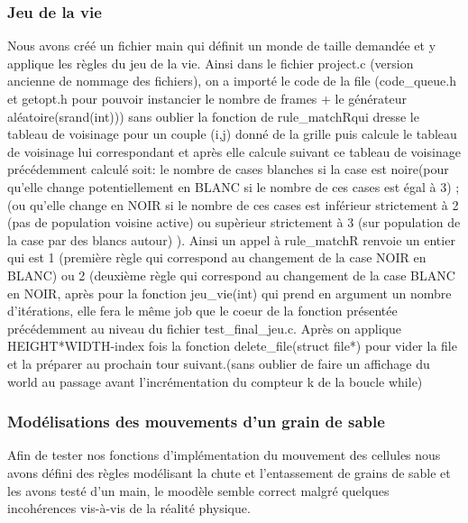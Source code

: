 \documentclass{article}
\begin{document}
{{{             \newline
            \downarrow \newline
            
            }
        
        
        \subsubsection{Jeu de la vie}
            {
            Nous avons créé un fichier main qui définit un monde de taille demandée et y applique les règles du jeu de la vie. Ainsi dans le fichier project.c (version ancienne de nommage des fichiers), on a importé le code de la file (code\_queue.h et getopt.h pour pouvoir instancier le nombre de frames + le générateur aléatoire(srand(int))) sans oublier la fonction de rule\_matchRqui dresse le tableau de voisinage pour un couple (i,j) donné de la grille puis calcule le tableau de voisinage lui correspondant et après elle calcule suivant ce tableau de voisinage précédemment calculé soit: le nombre de cases blanches si la case est noire(pour qu'elle change potentiellement en BLANC si le nombre de ces cases est égal à 3) ; (ou qu'elle change en NOIR si le nombre de ces cases est inférieur strictement à 2 (pas de population voisine active) ou supèrieur strictement à 3 (sur population de la case par des blancs autour) ). Ainsi un appel à rule\_matchR renvoie un entier qui est 1 (première règle qui correspond au changement de la case NOIR en BLANC) ou 2 (deuxième règle qui correspond au changement de la case BLANC en NOIR, après pour la fonction jeu\_vie(int) qui prend en argument un nombre d'itérations, elle fera le même job que le coeur de la fonction présentée précédemment au niveau du fichier test\_final\_jeu.c. Après on applique HEIGHT*WIDTH-index fois la fonction delete\_file(struct file*) pour vider la file et la préparer au prochain tour suivant.(sans oublier de faire un affichage du world au passage avant l'incrémentation du compteur k de la boucle while)
            }
        
        \subsubsection{Modélisations des mouvements d'un grain de sable}
            {
            
            Afin de tester nos fonctions d'implémentation du mouvement des cellules nous avons défini des règles modélisant la chute et l'entassement de grains de sable et les avons testé d'un main, le moodèle semble correct malgré quelques incohérences vis-à-vis de la réalité physique.
            
            }
        
        
        
        }
    
    }
\end{document}
